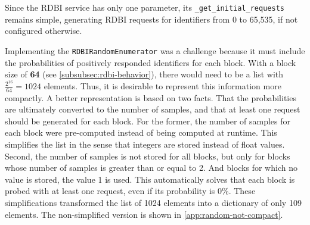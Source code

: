 Since the RDBI service has only one parameter, its \texttt{_get_initial_requests} remains simple, generating RDBI requests for identifiers from 0 to 65,535, if not configured otherwise.

Implementing the \texttt{RDBIRandomEnumerator} was a challenge because it must include the probabilities of positively responded identifiers for each block. With a block size of \textbf{64} (see \autoref{subsubsec:rdbi-behavior}), there would need to be a list with $\frac{2^{16}}{64} = 1024$ elements. Thus, it is desirable to represent this information more compactly. A better representation is based on two facts. That the probabilities are ultimately converted to the number of samples, and that at least one request should be generated for each block. For the former, the number of samples for each block were pre-computed instead of being computed at runtime. This simplifies the list in the sense that integers are stored instead of float values. Second, the number of samples is not stored for all blocks, but only for blocks whose number of samples is greater than or equal to 2. And blocks for which no value is stored, the value 1 is used. This automatically solves that each block is probed with at least one request, even if its probability is 0\%. These simplifications transformed the list of 1024 elements into a dictionary of only 109 elements. The non-simplified version is shown in \autoref{app:random-not-compact}.


